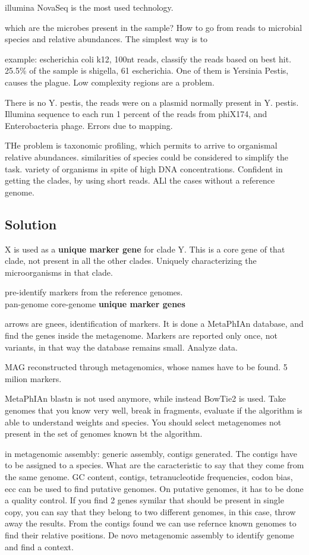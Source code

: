 illumina NovaSeq is the most used technology. 


which are the microbes present in the sample? 
How to go from reads to microbial species and relative abundances. The simplest way is to


example: escherichia coli k12, 100nt reads, classify the reads based on best hit. 25.5\% of the sample is shigella, 61 escherichia. One of them is Yersinia Pestis, causes the plague.
Low complexity regions are a problem.

There is no Y. pestis, the reads were on a plasmid normally present in Y. pestis. Illumina sequence to each run 1 percent of the reads from phiX174, and Enterobacteria phage. Errors due to mapping. 

THe problem is taxonomic profiling, which permits to arrive to organismal relative abundances. similarities of species could be considered to simplify the task. variety of organisms in spite of high DNA concentrations. Confident in getting the clades, by using short reads. ALl the cases without a reference genome.

\subsection{Solution}
X is used as a \textbf{unique marker gene} for clade Y. This is a core gene of that clade, not present in all the other clades. Uniquely characterizing the microorganisms in that clade.

pre-identify markers from the reference genomes.\\
 pan-genome \longrightarrow core-genome \rightarrow \textbf{unique marker genes} 
 
arrows are gnees, identification of markers. It is done a MetaPhIAn database, and find the genes inside the metagenome. Markers are reported only once, not variants, in that way the database remains small. Analyze data. 

MAG reconstructed through metagenomics, whose names have to be found. 5 milion markers.

MetaPhIAn blastn is not used anymore, while instead BowTie2 is used. 
Take genomes that you know very well, break in fragments, evaluate if the algorithm is able to understand weights and species. You should select metagenomes not present in the set of genomes known bt the algorithm. 

in metagenomic assembly:
generic assembly, contigs generated. The contigs have to be assigned to a species. What are the caracteristic to say that they come from the same genome. GC content, contigs, tetranucleotide frequencies, codon bias, ecc can be used to find putative genomes. On putative genomes, it has to be done a quality control. If you find 2 genes symilar that should be present in single copy, you can say that they belong to two different genomes, in this case, throw away the results. From the contigs found we can use refernce known genomes to find their relative positions. De novo metagenomic assembly to identify genome and find a context. 

